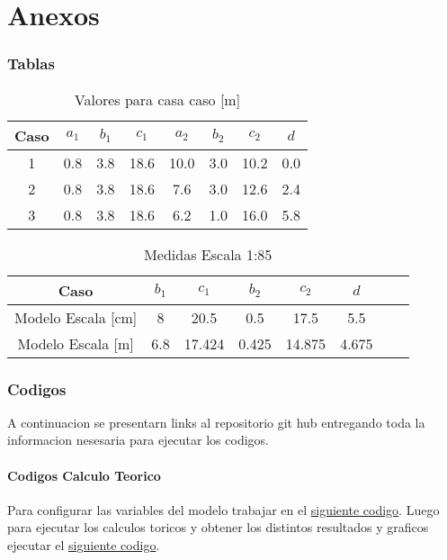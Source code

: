 \part{Anexos}

\section{Tablas}

\begin{table}[H]
    \centering
    \begin{tabular}{|c|c|c|c|c|c|c|c|}
    \hline
    Caso & $a_1$ & $b_1$ & $c_1$ & $a_2$ & $b_2$ & $c_2$ & $d$ \\ \hline
    1    & 0.8   & 3.8   & 18.6  & 10.0  & 3.0   & 10.2  & 0.0 \\ \hline
    2    & 0.8   & 3.8   & 18.6  & 7.6   & 3.0   & 12.6  & 2.4  \\ \hline
    3    & 0.8   & 3.8   & 18.6  & 6.2   & 1.0   & 16.0  & 5.8  \\ \hline
    \end{tabular}
    \caption{Valores para casa caso [m]}
    \label{tab:medidas}
\end{table}

\begin{table}[H]
    \centering
    \begin{tabular}{|c|c|c|c|c|c|c|c|}
    \hline
    Caso  & $b_1$ & $c_1$  & $b_2$ & $c_2$ & $d$ \\ \hline
    Modelo Escala [cm] & 8  & 20.5  & 0.5   & 17.5  & 5.5 \\ \hline
    Modelo Escala [m] & 6.8  & 17.424 & 0.425   & 14.875  & 4.675  \\ \hline
    \end{tabular}
    \caption{Medidas Escala 1:85}
    \label{tab:medidas_escaladas}
\end{table}

\section{Codigos}

A continuacion se presentarn links al repositorio git hub entregando toda la informacion nesesaria para ejecutar los codigos.

\subsection{Codigos Calculo Teorico}

Para configurar las variables del modelo trabajar en el \href{https://github.com/LukasWolff2002/ENTREGA_3_MCOC/blob/main/CODIGO/CALCULOS_MANUALES/variables.py}{siguiente codigo}. Luego para ejecutar los calculos toricos y obtener los distintos resultados y graficos ejecutar el \href{https://github.com/LukasWolff2002/ENTREGA_3_MCOC/blob/main/CODIGO/CALCULOS_MANUALES/main.py}{siguiente codigo}.

